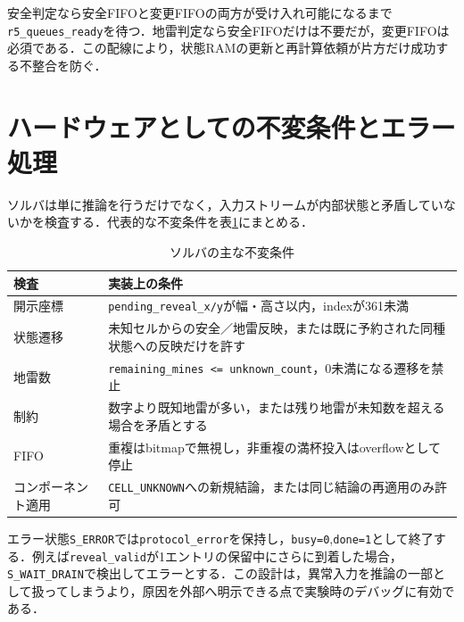 安全判定なら安全FIFOと変更FIFOの両方が受け入れ可能になるまで\texttt{r5\_queues\_ready}を待つ．地雷判定なら安全FIFOだけは不要だが，変更FIFOは必須である．この配線により，状態RAMの更新と再計算依頼が片方だけ成功する不整合を防ぐ．

\section{ハードウェアとしての不変条件とエラー処理}
\label{sec:solver-invariants}

ソルバは単に推論を行うだけでなく，入力ストリームが内部状態と矛盾していないかを検査する．代表的な不変条件を表\ref{tab:solver-invariants}にまとめる．

\begin{table}[tb]
\centering
\caption{ソルバの主な不変条件}
\label{tab:solver-invariants}
\begin{tabularx}{\linewidth}{lX}
\toprule
検査 & 実装上の条件\\
\midrule
開示座標 & \texttt{pending\_reveal\_x/y}が幅・高さ以内，indexが361未満\\
状態遷移 & 未知セルからの安全／地雷反映，または既に予約された同種状態への反映だけを許す\\
地雷数 & \texttt{remaining\_mines <= unknown\_count}，0未満になる遷移を禁止\\
制約 & 数字より既知地雷が多い，または残り地雷が未知数を超える場合を矛盾とする\\
FIFO & 重複はbitmapで無視し，非重複の満杯投入はoverflowとして停止\\
コンポーネント適用 & \texttt{CELL\_UNKNOWN}への新規結論，または同じ結論の再適用のみ許可\\
\bottomrule
\end{tabularx}
\end{table}

エラー状態\texttt{S\_ERROR}では\texttt{protocol\_error}を保持し，\texttt{busy=0},\texttt{done=1}として終了する．例えば\texttt{reveal\_valid}が1エントリの保留中にさらに到着した場合，\texttt{S\_WAIT\_DRAIN}で検出してエラーとする．この設計は，異常入力を推論の一部として扱ってしまうより，原因を外部へ明示できる点で実験時のデバッグに有効である．



